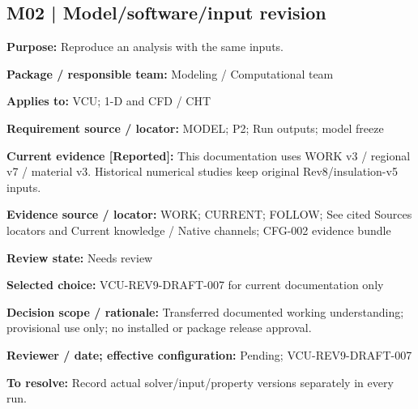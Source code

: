 \documentclass[11pt]{article}
\begin{document}
\par\noindent\begin{minipage}{\textwidth}\small\setlength{\parskip}{2pt}
\subsection*{M02 | Model/software/input revision}
\textbf{Purpose:} Reproduce an analysis with the same inputs.\par
\textbf{Package / responsible team:} Modeling / Computational team\par
\textbf{Applies to:} VCU; 1-D and CFD / CHT\par
\textbf{Requirement source / locator:} MODEL; P2; Run outputs; model freeze\par
\textbf{Current evidence [Reported]:} This documentation uses WORK v3 / regional v7 / material v3. Historical numerical studies keep original Rev8/insulation-v5 inputs.\par
\textbf{Evidence source / locator:} WORK; CURRENT; FOLLOW; See cited Sources locators and Current knowledge / Native channels; CFG-002 evidence bundle\par
\textbf{Review state:} Needs review\par
\textbf{Selected choice:} VCU-REV9-DRAFT-007 for current documentation only\par
\textbf{Decision scope / rationale:} Transferred documented working understanding; provisional use only; no installed or package release approval.\par
\textbf{Reviewer / date; effective configuration:} Pending; VCU-REV9-DRAFT-007\par
\textbf{To resolve:} Record actual solver/input/property versions separately in every run.\par
\end{minipage}\par\vspace{5pt}
\end{document}
